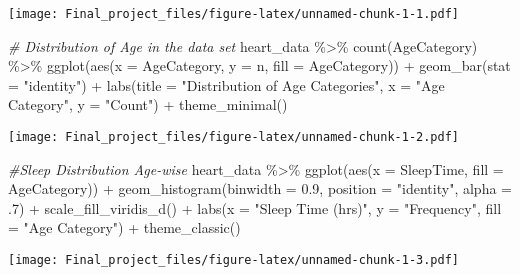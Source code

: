 \documentclass[
]{article}
\newenvironment{Shaded}{\begin{snugshade}}{\end{snugshade}}
\newcommand{\AttributeTok}[1]{\textcolor[rgb]{0.77,0.63,0.00}{#1}}
\newcommand{\CommentTok}[1]{\textcolor[rgb]{0.56,0.35,0.01}{\textit{#1}}}
\newcommand{\DecValTok}[1]{\textcolor[rgb]{0.00,0.00,0.81}{#1}}
\newcommand{\FloatTok}[1]{\textcolor[rgb]{0.00,0.00,0.81}{#1}}
\newcommand{\FunctionTok}[1]{\textcolor[rgb]{0.00,0.00,0.00}{#1}}
\newcommand{\NormalTok}[1]{#1}
\newcommand{\SpecialCharTok}[1]{\textcolor[rgb]{0.00,0.00,0.00}{#1}}
\newcommand{\StringTok}[1]{\textcolor[rgb]{0.31,0.60,0.02}{#1}}
\begin{document}
\texttt{[image: Final\_project\_files/figure-latex/unnamed-chunk-1-1.pdf]}

\begin{Shaded}
\begin{Highlighting}[]
\CommentTok{\# Distribution of Age in the data set}
\NormalTok{heart\_data }\SpecialCharTok{\%\textgreater{}\%} 
  \FunctionTok{count}\NormalTok{(AgeCategory) }\SpecialCharTok{\%\textgreater{}\%}
  \FunctionTok{ggplot}\NormalTok{(}\FunctionTok{aes}\NormalTok{(}\AttributeTok{x =}\NormalTok{ AgeCategory, }\AttributeTok{y =}\NormalTok{ n, }\AttributeTok{fill =}\NormalTok{ AgeCategory)) }\SpecialCharTok{+}
  \FunctionTok{geom\_bar}\NormalTok{(}\AttributeTok{stat =} \StringTok{"identity"}\NormalTok{) }\SpecialCharTok{+}
  \FunctionTok{labs}\NormalTok{(}\AttributeTok{title =} \StringTok{"Distribution of Age Categories"}\NormalTok{, }\AttributeTok{x =} \StringTok{"Age Category"}\NormalTok{, }\AttributeTok{y =} \StringTok{"Count"}\NormalTok{) }\SpecialCharTok{+}
  \FunctionTok{theme\_minimal}\NormalTok{()}
\end{Highlighting}
\end{Shaded}

\texttt{[image: Final\_project\_files/figure-latex/unnamed-chunk-1-2.pdf]}

\begin{Shaded}
\begin{Highlighting}[]
\CommentTok{\#Sleep Distribution Age{-}wise}
\NormalTok{heart\_data }\SpecialCharTok{\%\textgreater{}\%}
  \FunctionTok{ggplot}\NormalTok{(}\FunctionTok{aes}\NormalTok{(}\AttributeTok{x =}\NormalTok{ SleepTime, }\AttributeTok{fill =}\NormalTok{ AgeCategory)) }\SpecialCharTok{+}
  \FunctionTok{geom\_histogram}\NormalTok{(}\AttributeTok{binwidth =} \FloatTok{0.9}\NormalTok{, }\AttributeTok{position =} \StringTok{"identity"}\NormalTok{, }\AttributeTok{alpha =}\NormalTok{ .}\DecValTok{7}\NormalTok{) }\SpecialCharTok{+}
  \FunctionTok{scale\_fill\_viridis\_d}\NormalTok{() }\SpecialCharTok{+}
  \FunctionTok{labs}\NormalTok{(}\AttributeTok{x =} \StringTok{"Sleep Time (hrs)"}\NormalTok{, }\AttributeTok{y =} \StringTok{"Frequency"}\NormalTok{, }\AttributeTok{fill =} \StringTok{"Age Category"}\NormalTok{) }\SpecialCharTok{+}
  \FunctionTok{theme\_classic}\NormalTok{()}
\end{Highlighting}
\end{Shaded}

\texttt{[image: Final\_project\_files/figure-latex/unnamed-chunk-1-3.pdf]}
\end{document}
